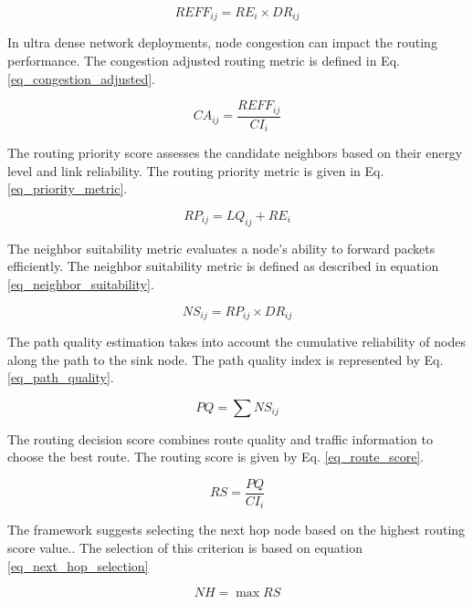 \documentclass[a4paper,fleqn]{cas-dc}
\numberwithin{equation}{section}
\begin{document}
\begin{equation}
REFF_{ij} = RE_i \times DR_{ij}
\label{eq_routing_efficiency}
\end{equation}

In ultra dense network deployments, node congestion can impact the routing performance. The congestion adjusted routing metric is defined in Eq. \ref{eq_congestion_adjusted}.

\begin{equation}
CA_{ij} = \frac{REFF_{ij}}{CI_i}
\label{eq_congestion_adjusted}
\end{equation}

The routing priority score assesses the candidate neighbors based on their energy level and link reliability. The routing priority metric is given in Eq. \ref{eq_priority_metric}.

\begin{equation}
RP_{ij} = LQ_{ij} + RE_i
\label{eq_priority_metric}
\end{equation}

The neighbor suitability metric evaluates a node's ability to forward packets efficiently. The neighbor suitability metric is defined as described in equation \ref{eq_neighbor_suitability}.

\begin{equation}
NS_{ij} = RP_{ij} \times DR_{ij}
\label{eq_neighbor_suitability}
\end{equation}

The path quality estimation takes into account the cumulative reliability of nodes along the path to the sink node. The path quality index is represented by Eq. \ref{eq_path_quality}.

\begin{equation}
PQ = \sum NS_{ij}
\label{eq_path_quality}
\end{equation}

The routing decision score combines route quality and traffic information to choose the best route. The routing score is given by Eq. \ref{eq_route_score}.

\begin{equation}
RS = \frac{PQ}{CI_i}
\label{eq_route_score}
\end{equation}

The framework suggests selecting the next hop node based on the highest routing score value.. The selection of this criterion is based on equation \ref{eq_next_hop_selection}

\begin{equation}
NH = \max RS
\label{eq_next_hop_selection}
\end{equation}
\end{document}
